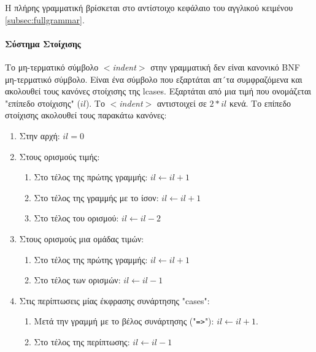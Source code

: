 \documentclass[diploma]{softlab-thesis}
\begin{document}
Η πλήρης γραμματική βρίσκεται στο αντίστοιχο κεφάλαιο του αγγλικού κειμένου
\ref{subsec:fullgrammar}.

\paragraph{Σύστημα Στοίχισης}

Το μη-τερματικό σύμβολο \textit{$<$indent$>$} στην γραμματική δεν είναι
κανονικό BNF μη-τερματικό σύμβολο. Είναι ένα σύμβολο που εξαρτάται απ´τα
συμφραζόμενα και ακολουθεί τους κανόνες στοίχισης της lcases.
Εξαρτάται από μια τιμή που ονομάζεται "επίπεδο στοίχισης" ($il$).
Το \textit{$<$indent$>$} αντιστοιχεί σε $2*il$ κενά. Το επίπεδο στοίχισης
ακολουθεί τους παρακάτω κανόνες:

\begin{enumerate}

\item
Στην αρχή: $il = 0$

\item
Στους ορισμούς τιμής:
  \begin{enumerate}

  \item
  Στο τέλος της πρώτης γραμμής: $il \leftarrow il + 1$

  \item
  Στο τέλος της γραμμής με το ίσον: $il \leftarrow il + 1$

  \item
  Στο τέλος του ορισμού: $il \leftarrow il - 2$
  \end{enumerate}

\item
Στους ορισμούς μια ομάδας τιμών:
  \begin{enumerate}

  \item
  Στο τέλος της πρώτης γραμμής: $il \leftarrow il + 1$

  \item
  Στο τέλος των ορισμών: $il \leftarrow il - 1$
  \end{enumerate}

\item
Στις περίπτωσεις μίας έκφρασης συνάρτησης "cases":
  \begin{enumerate}

  \item
  Μετά την γραμμή με το βέλος συνάρτησης ("\verb|=>|"): $il \leftarrow il + 1$.

  \item
  Στο τέλος της περίπτωσης: $il \leftarrow il - 1$
  \end{enumerate}


\end{enumerate}
\end{document}
